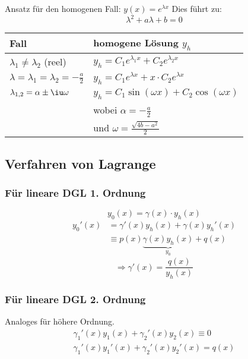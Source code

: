 			Ansatz für den homogenen Fall: $y(x) = e^{\lambda x}$
			Dies führt zu:
			\[
				\lambda^2 + a \lambda + b = 0
			\]
			
			\begin{tabular}{l@{$\qquad$}l}
				\toprule
				\textbf{Fall} & \textbf{homogene Lösung} $y_h$ \\
				\midrule
				$\lambda_1 \neq \lambda_2$ (reel) & $y_h = C_1 e^{\lambda_1 x} + C_2 e^{\lambda_2 x}$ \\ [5pt]
				$\lambda = \lambda_1 = \lambda_2 = -\frac{a}{2}$ & $y_h = C_1 e^{\lambda x} + x \cdot C_2 e^{\lambda x}$ \\ [5pt]
				$\lambda_{1,2} = \alpha \pm \iu \omega$ & $y_h = C_1 \sin (\omega x) + C_2 \cos (\omega x)$ \\ [2pt]
				 & wobei $\alpha = -\frac{a}{2}$ \\ [2pt]
				 & und $\omega = \frac{\sqrt{4b-a^2}}{2}$ \\
				\bottomrule
			\end{tabular}
			
	\subsection{Verfahren von Lagrange} %
		\subsubsection{Für lineare DGL 1. Ordnung} %
			\[
				y_0(x) = \gamma(x) \cdot y_h(x)
			\]
			\begin{align*}
				y_0'(x) &= \gamma'(x) y_h(x) + \gamma(x) y_h'(x) \\
				&\equiv p(x) \underbrace{\gamma(x) y_h(x)}_{y_0} + q(x)
			\end{align*}
			\[
				\Rightarrow \gamma'(x) = \frac{q(x)}{y_h(x)}
			\]
		\subsubsection{Für lineare DGL 2. Ordnung} %
			Analoges für höhere Ordnung.
			\begin{gather*}
				\gamma_1'(x) y_1 (x) + \gamma_2'(x) y_2(x) \equiv 0 \\
				\gamma_1'(x) y_1' (x) + \gamma_2'(x) y_2'(x) = q(x)
			\end{gather*}
